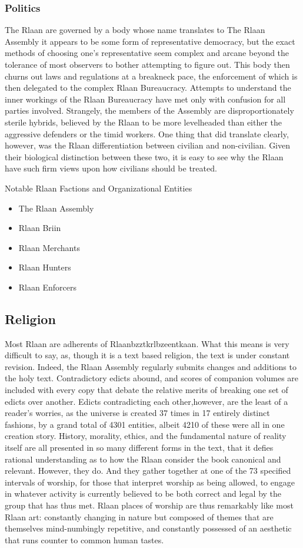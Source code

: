 \subsubsection{Politics}

The Rlaan are governed by a body whose name translates to The Rlaan
Assembly it appears to be some form of representative democracy, but
the exact methods of choosing one's representative seem complex and
arcane beyond the tolerance of most observers to bother attempting to
figure out. This body then churns out laws and regulations at a
breakneck pace, the enforcement of which is then delegated to the
complex Rlaan Bureaucracy. Attempts to understand the inner workings
of the Rlaan Bureaucracy have met only with confusion for all parties
involved. Strangely, the members of the Assembly are
disproportionately sterile hybrids, believed by the Rlaan to be more
levelheaded than either the aggressive defenders or the timid
workers. One thing that did translate clearly, however, was the Rlaan
differentiation between civilian and non-civilian. Given their
biological distinction between these two, it is easy to see why the
Rlaan have such firm views upon how civilians should be treated.

Notable Rlaan Factions and Organizational Entities
\begin{itemize}
\item The Rlaan Assembly 
\item Rlaan Briin 
\item Rlaan Merchants 
\item Rlaan Hunters 
\item Rlaan Enforcers 
\end{itemize}
\subsection{Religion}
\label{Rlaanbzztkrlbzeentkaan}
Most Rlaan are adherents of Rlaanbzztkrlbzeentkaan. What this means is
very difficult to say, as, though it is a text based religion, the
text is under constant revision. Indeed, the Rlaan Assembly regularly
submits changes and additions to the holy text. Contradictory edicts
abound, and scores of companion volumes are included with every copy
that debate the relative merits of breaking one set of edicts over
another. Edicts contradicting each other,however, are the least of a
reader's worries, as the universe is created 37 times in 17 entirely
distinct fashions, by a grand total of 4301 entities, albeit 4210 of
these were all in one creation story. History, morality, ethics, and
the fundamental nature of reality itself are all presented in so many
different forms in the text, that it defies rational understanding as
to how the Rlaan consider the book canonical and relevant. However,
they do. And they gather together at one of the 73 specified intervals
of worship, for those that interpret worship as being allowed, to
engage in whatever activity is currently believed to be both correct
and legal by the group that has thus met. Rlaan places of worship are
thus remarkably like most Rlaan art: constantly changing in nature but
composed of themes that are themselves mind-numbingly repetitive, and
constantly possessed of an aesthetic that runs counter to common human
tastes.

